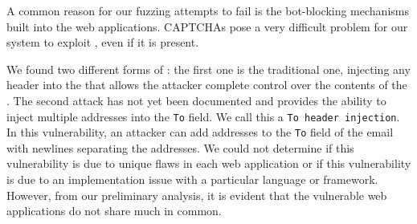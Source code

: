 
	

	A common reason for our fuzzing attempts to fail is the bot-blocking mechanisms built into the web applications. CAPTCHAs pose a very difficult problem for our system to exploit \ehi, even if it is present.

    
    We found two different forms of \ehi: the first one is the traditional one, injecting any header into the \email that allows the attacker complete control over the contents of the \email. 
The second attack has not yet been documented and provides the ability to inject multiple \email addresses into the \texttt{To} field. We call this a \texttt{To header injection}. In this  vulnerability, an attacker can add addresses to the \texttt{To} field of the email with newlines separating the \email addresses. We could not determine if this vulnerability is due to unique flaws in each web application or if this vulnerability is due to an implementation issue with a particular language or framework. However, from our preliminary analysis, it is evident that the vulnerable web applications do not share much in common. 


